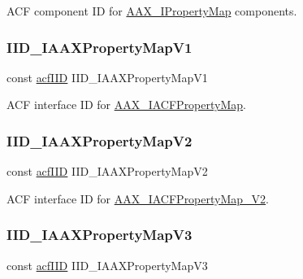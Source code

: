 A\+CF component ID for \mbox{\hyperlink{a01869}{A\+A\+X\+\_\+\+I\+Property\+Map}} components. 

\mbox{\label{a00683_a6f1eedd8a2328492efa7a357565b8e2d}} 
\subsubsection{\texorpdfstring{IID\_IAAXPropertyMapV1}{IID\_IAAXPropertyMapV1}}
{\footnotesize\ttfamily const \mbox{\hyperlink{a00269_a59df0b41744eee7a066787aaedf97f67}{acf\+I\+ID}} I\+I\+D\+\_\+\+I\+A\+A\+X\+Property\+Map\+V1}



A\+CF interface ID for \mbox{\hyperlink{a01745}{A\+A\+X\+\_\+\+I\+A\+C\+F\+Property\+Map}}. 

\mbox{\label{a00683_a39b9cbfe4f60ec41bb43be35e3d4d568}} 
\subsubsection{\texorpdfstring{IID\_IAAXPropertyMapV2}{IID\_IAAXPropertyMapV2}}
{\footnotesize\ttfamily const \mbox{\hyperlink{a00269_a59df0b41744eee7a066787aaedf97f67}{acf\+I\+ID}} I\+I\+D\+\_\+\+I\+A\+A\+X\+Property\+Map\+V2}



A\+CF interface ID for \mbox{\hyperlink{a01749}{A\+A\+X\+\_\+\+I\+A\+C\+F\+Property\+Map\+\_\+\+V2}}. 

\mbox{\label{a00683_a26d424454425e6feb3a0c120466fe971}} 
\subsubsection{\texorpdfstring{IID\_IAAXPropertyMapV3}{IID\_IAAXPropertyMapV3}}
{\footnotesize\ttfamily const \mbox{\hyperlink{a00269_a59df0b41744eee7a066787aaedf97f67}{acf\+I\+ID}} I\+I\+D\+\_\+\+I\+A\+A\+X\+Property\+Map\+V3}



